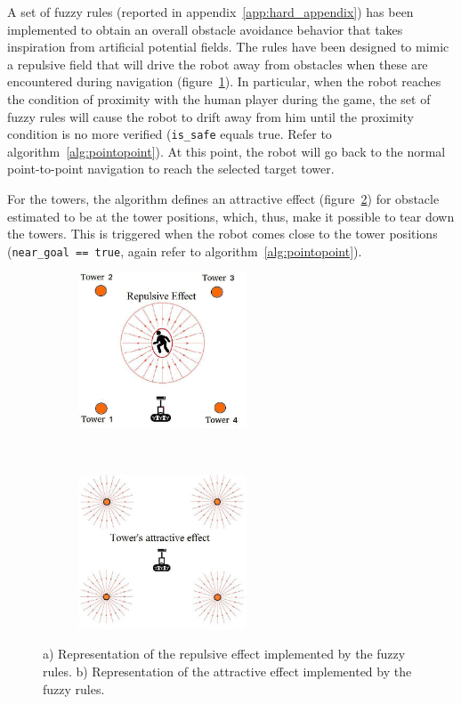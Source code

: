 A set of fuzzy rules (reported in appendix~\ref{app:hard_appendix})	has been implemented to obtain an overall obstacle avoidance behavior that takes inspiration from artificial potential fields. The rules have been designed to mimic a repulsive field that will drive the robot away from obstacles when these are encountered during navigation (figure~\ref{fig:avoid1}). In particular, when the robot reaches the condition of proximity with the human player during the game, the set of fuzzy rules will cause the robot to drift away from him until the proximity condition is no more verified (\verb|is_safe| equals true. Refer to algorithm~\ref{alg:pointopoint}). At this point, the robot will go back to the normal point-to-point navigation to reach the selected target tower.

For the towers, the algorithm defines an attractive effect (figure~\ref{fig:avoid2}) for obstacle estimated to be at the tower positions, which, thus, make it possible to tear down the towers. This is triggered when the robot comes close to the tower positions (\verb|near_goal == true|, again refer to algorithm~\ref{alg:pointopoint}). 

\begin{figure}[H]
	\centering
	\begin{subfigure}[b]{0.4\textwidth}
		\includegraphics[width=5cm]{images/03-foundation/avoid1}
		\caption{}
		\label{fig:avoid1} 
	\end{subfigure}
    ~
	\begin{subfigure}[b]{0.4\textwidth}
		\includegraphics[width=5cm]{images/03-foundation/avoid2}
		\caption{}
		\label{fig:avoid2}
	\end{subfigure}
	\caption{a) Representation of the repulsive effect implemented by the fuzzy rules. b) Representation of the attractive effect implemented by the fuzzy rules. }
	\label{rulesbehavior}
\end{figure}


